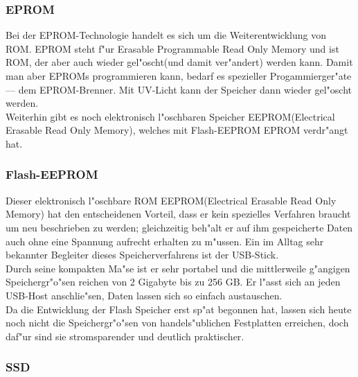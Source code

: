				\subsubsection{EPROM}
				\label{ch:Technisch:sec:Elektronische Speicherung:sub:Fl"uchtig:subsub:EPROM}
					
					Bei der EPROM-Technologie handelt es sich um die Weiterentwicklung von ROM. EPROM steht f"ur \glqq Erasable Programmable Read Only Memory\grqq{} und ist ROM, der aber auch wieder gel"oscht(und damit ver"andert) werden kann. Damit man aber EPROMs programmieren kann, bedarf es spezieller Progammierger"ate --- dem \glqq EPROM-Brenner\grqq{}. Mit UV-Licht kann der Speicher dann wieder gel"oscht werden.
					\\
					Weiterhin gibt es noch elektronisch l"oschbaren Speicher EEPROM(\glqq Electrical Erasable Read Only Memory\grqq{}), welches mit Flash-EEPROM EPROM verdr"angt hat.
				
				\subsubsection{Flash-EEPROM}
				\label{ch:Technisch:sec:Elektronische Speicherung:sub:Fl"uchtig:subsub:Flash-EEPROM}
				
					Dieser elektronisch l"oschbare ROM EEPROM(\glqq Electrical Erasable Read Only Memory\grqq{}) hat den entscheidenen Vorteil, dass er kein spezielles Verfahren braucht um neu beschrieben zu werden; gleichzeitig beh"alt er auf ihm gespeicherte Daten auch ohne eine Spannung aufrecht erhalten zu m"ussen. Ein im Alltag sehr bekannter Begleiter dieses Speicherverfahrens ist der USB-Stick. 
					\\
					Durch seine kompakten Ma"se ist er sehr portabel und die mittlerweile g"angigen Speichergr"o"sen reichen von 2 Gigabyte bis zu 256 GB. Er l"asst sich an jeden USB-Host anschlie"sen, Daten lassen sich so einfach austauschen. 
					\\
					Da die Entwicklung der Flash Speicher erst sp"at begonnen hat, lassen sich heute noch nicht die Speichergr"o"sen von handels"ublichen Festplatten erreichen, doch daf"ur sind sie stromsparender und deutlich praktischer.
				
				\subsubsection{SSD}
				\label{ch:Technisch:sec:Elektronische Speicherung:sub:Fl"uchtig:subsub:SSD}
				
